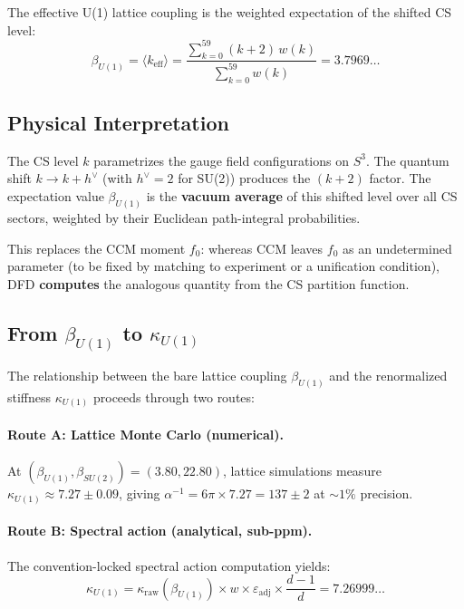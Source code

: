 \documentclass[12pt,a4paper]{article}
\begin{document}
The effective U(1) lattice coupling is the weighted expectation of the
shifted CS level:
\begin{equation}\label{eq:beta-def}
\beta_{U(1)} = \langle k_{\mathrm{eff}} \rangle
= \frac{\sum_{k=0}^{59}(k+2)\,w(k)}{\sum_{k=0}^{59}w(k)}
= 3.7969\ldots
\end{equation}

\subsection{Physical Interpretation}

The CS level $k$ parametrizes the gauge field configurations on $S^3$.
The quantum shift $k \to k + h^\vee$ (with $h^\vee = 2$ for SU(2))
produces the $(k+2)$ factor.  The expectation value $\beta_{U(1)}$
is the \textbf{vacuum average} of this shifted level over all CS sectors,
weighted by their Euclidean path-integral probabilities.

This replaces the CCM moment $f_0$: whereas CCM leaves $f_0$ as an
undetermined parameter (to be fixed by matching to experiment or a
unification condition), DFD \textbf{computes} the analogous quantity
from the CS partition function.

\subsection{From $\beta_{U(1)}$ to $\kappa_{U(1)}$}

The relationship between the bare lattice coupling $\beta_{U(1)}$ and the
renormalized stiffness $\kappa_{U(1)}$ proceeds through two routes:

\paragraph{Route A: Lattice Monte Carlo (numerical).}
At $(\beta_{U(1)}, \beta_{SU(2)}) = (3.80, 22.80)$, lattice simulations
measure $\kappa_{U(1)} \approx 7.27 \pm 0.09$, giving
$\alpha^{-1} = 6\pi \times 7.27 = 137 \pm 2$ at $\sim 1\%$ precision.

\paragraph{Route B: Spectral action (analytical, sub-ppm).}
The convention-locked spectral action computation yields:
\begin{equation}
\kappa_{U(1)} = \kappa_{\mathrm{raw}}(\beta_{U(1)}) \times w
\times \varepsilon_{\mathrm{adj}} \times \frac{d-1}{d}
= 7.26999\ldots
\end{equation}
\end{document}
